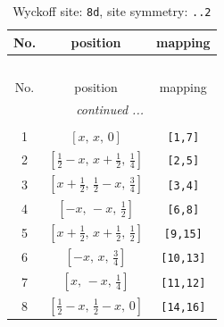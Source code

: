 \documentclass[fleqn,8pt]{jsarticle}
\begin{document}
\begin{longtable}{ccc}
\caption{Wyckoff site: {\tt 8d}, site symmetry: {\tt ..2}}
 \\
 \hline \hline
No. & position & mapping \\ \hline \endfirsthead

\multicolumn{2}{l}{\tablename\ \thetable{}} \\
 \hline \hline
No. & position & mapping \\ \hline \endhead

 \hline \hline
\multicolumn{2}{r}{\footnotesize\it continued ...} \\ \endfoot

 \hline \hline
\multicolumn{2}{r}{} \\ \endlastfoot

1 & $\left[ x,\, x,\, 0 \right]$ & {\tt [1,7]} \\ \hline
2 & $\left[ \frac{1}{2} - x,\, x + \frac{1}{2},\, \frac{1}{4} \right]$ & {\tt [2,5]} \\ \hline
3 & $\left[ x + \frac{1}{2},\, \frac{1}{2} - x,\, \frac{3}{4} \right]$ & {\tt [3,4]} \\ \hline
4 & $\left[ - x,\, - x,\, \frac{1}{2} \right]$ & {\tt [6,8]} \\ \hline
5 & $\left[ x + \frac{1}{2},\, x + \frac{1}{2},\, \frac{1}{2} \right]$ & {\tt [9,15]} \\ \hline
6 & $\left[ - x,\, x,\, \frac{3}{4} \right]$ & {\tt [10,13]} \\ \hline
7 & $\left[ x,\, - x,\, \frac{1}{4} \right]$ & {\tt [11,12]} \\ \hline
8 & $\left[ \frac{1}{2} - x,\, \frac{1}{2} - x,\, 0 \right]$ & {\tt [14,16]} \\
\end{longtable}
\renewcommand{\arraystretch}{1.2}
\end{document}
